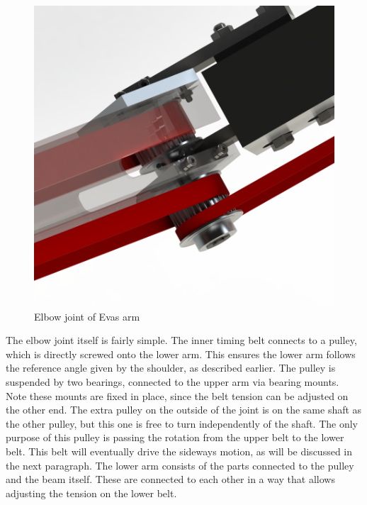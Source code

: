 \documentclass[technical_document.tex]{subfiles}
\begin{document}
\begin{figure}[ht!]
	\centering
	\mbox{\includegraphics[scale=1.0]{Images/arm_elbow.png}}
	\caption{Elbow joint of Eva\textquotesingle{}s arm}
	\label{fig:arm_elbow}
\end{figure}

The elbow joint itself is fairly simple. The inner timing belt connects to a pulley, which is directly screwed onto the lower arm. This ensures the lower arm follows the reference angle given by the shoulder, as described earlier. The pulley is suspended by two bearings, connected to the upper arm via bearing mounts. Note these mounts are fixed in place, since the belt tension can be adjusted on the other end. The extra pulley on the outside of the joint is on the same shaft as the other pulley, but this one is free to turn independently of the shaft. The only purpose of this pulley is passing the rotation from the upper belt to the lower belt. This belt will eventually drive the sideways motion, as will be discussed in the next paragraph. The lower arm consists of the parts connected to the pulley and the beam itself. These are connected to each other in a way that allows adjusting the tension on the lower belt.
\end{document}
